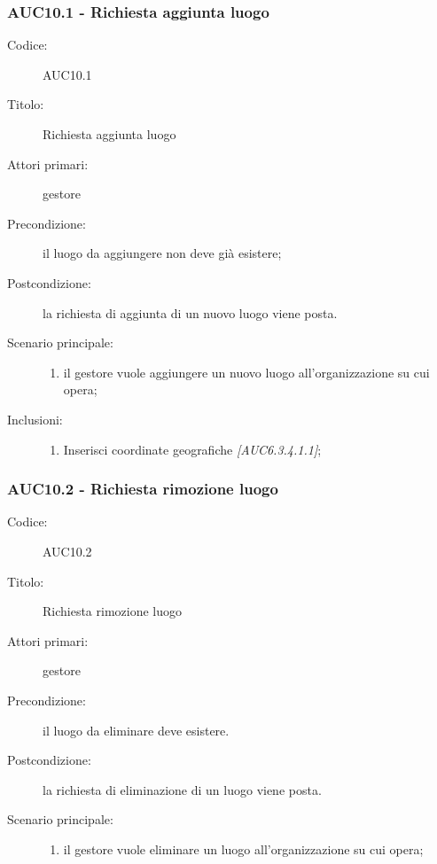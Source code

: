 \documentclass[casi-duso]{subfiles}
\begin{document}
\subsubsection{AUC10.1 - Richiesta aggiunta luogo}%
\label{subsub:AUC10.1}
\begin{description}
  \item[Codice:] AUC10.1
  \item[Titolo:] Richiesta aggiunta luogo
  \item[Attori primari:] gestore
  \item[Precondizione:] il luogo da aggiungere non deve già esistere;
  \item[Postcondizione:] la richiesta di aggiunta di un nuovo luogo viene posta.
  \item[Scenario principale:]
  \begin{enumerate}
    \item il gestore vuole aggiungere un nuovo luogo all'organizzazione su cui opera;
  \end{enumerate}
  \item[Inclusioni:]
  \begin{enumerate}
    \item Inserisci coordinate geografiche \emph{[AUC6.3.4.1.1]};
  \end{enumerate}
\end{description}

\subsubsection{AUC10.2 - Richiesta rimozione luogo}%
\label{subsub:AUC10.2}
\begin{description}
  \item[Codice:] AUC10.2
  \item[Titolo:] Richiesta rimozione luogo
  \item[Attori primari:] gestore
  \item[Precondizione:] il luogo da eliminare deve esistere.
  \item[Postcondizione:] la richiesta di eliminazione di un luogo viene posta.
  \item[Scenario principale:]
  \begin{enumerate}
    \item il gestore vuole eliminare un luogo all'organizzazione su cui opera;
  \end{enumerate}
\end{description}
\end{document}
